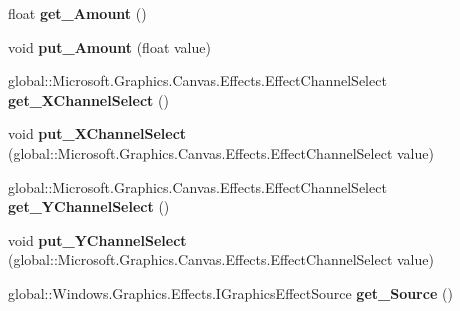 \begin{DoxyCompactItemize}
float {\bfseries get\+\_\+\+Amount} ()
\item 
\mbox{\label{interface_microsoft_1_1_graphics_1_1_canvas_1_1_effects_1_1_i_displacement_map_effect_a047ea38a52db6d5b2bc8f9a69edc8c1f}} 
void {\bfseries put\+\_\+\+Amount} (float value)
\item 
\mbox{\label{interface_microsoft_1_1_graphics_1_1_canvas_1_1_effects_1_1_i_displacement_map_effect_aae337ddbef97551a32257022a3fa66a9}} 
global\+::\+Microsoft.\+Graphics.\+Canvas.\+Effects.\+Effect\+Channel\+Select {\bfseries get\+\_\+\+X\+Channel\+Select} ()
\item 
\mbox{\label{interface_microsoft_1_1_graphics_1_1_canvas_1_1_effects_1_1_i_displacement_map_effect_abe51385c67bec880ea3db9f871d8a0b1}} 
void {\bfseries put\+\_\+\+X\+Channel\+Select} (global\+::\+Microsoft.\+Graphics.\+Canvas.\+Effects.\+Effect\+Channel\+Select value)
\item 
\mbox{\label{interface_microsoft_1_1_graphics_1_1_canvas_1_1_effects_1_1_i_displacement_map_effect_afdb278b27ceb0bcc8d4f160ecadfb370}} 
global\+::\+Microsoft.\+Graphics.\+Canvas.\+Effects.\+Effect\+Channel\+Select {\bfseries get\+\_\+\+Y\+Channel\+Select} ()
\item 
\mbox{\label{interface_microsoft_1_1_graphics_1_1_canvas_1_1_effects_1_1_i_displacement_map_effect_a21fd084ca58eb6bb042e123fb75cf549}} 
void {\bfseries put\+\_\+\+Y\+Channel\+Select} (global\+::\+Microsoft.\+Graphics.\+Canvas.\+Effects.\+Effect\+Channel\+Select value)
\item 
\mbox{\label{interface_microsoft_1_1_graphics_1_1_canvas_1_1_effects_1_1_i_displacement_map_effect_a3ae94b5f7ba6e9a6577d1f8e64818dde}} 
global\+::\+Windows.\+Graphics.\+Effects.\+I\+Graphics\+Effect\+Source {\bfseries get\+\_\+\+Source} ()

\end{DoxyCompactItemize}
